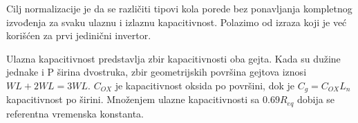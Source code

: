 Cilj normalizacije je da se različiti tipovi kola porede bez ponavljanja kompletnog izvođenja za svaku ulaznu i izlaznu kapacitivnost. Polazimo od izraza koji je već korišćen za prvi jedinični invertor.

Ulazna kapacitivnost predstavlja zbir kapacitivnosti oba gejta. Kada su dužine jednake i P širina dvostruka, zbir geometrijskih površina gejtova iznosi $WL+2WL=3WL$. $C_{OX}$ je kapacitivnost oksida po površini, dok je $C_g=C_{OX}L_n$ kapacitivnost po širini. Množenjem ulazne kapacitivnosti sa $0.69R_{eq}$ dobija se referentna vremenska konstanta.
